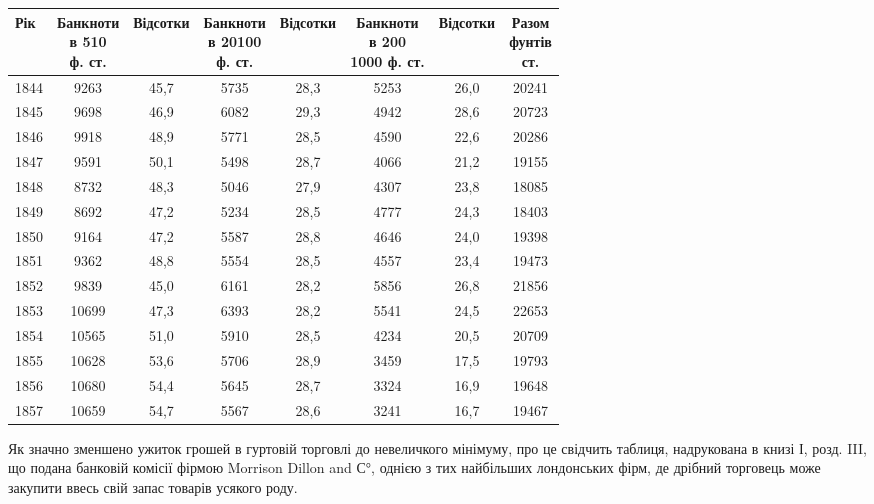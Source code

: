 \begin{table}[h]
  \small
  \begin{tabular}{l c c c c c c c}
  \toprule
Рік  &  \makecell{Банкноти\\ в 5\textendash{}10 \\ф. ст.} & Відсотки  &
\makecell{Банкноти\\ в 20\textendash{}100\\ ф. ст.} & Відсотки  &  \makecell{Банкноти\\ в 200\textendash{}\\1000
ф. ст.} & Відсотки &   \makecell{Разом\\  фунтів \\ ст.} \\
  \midrule
1844    &     \phantom{0}9263  &  45,7  &  5735 & 28,3 & 5253 &   26,0 &   20241\\
1845    &     \phantom{0}9698  &  46,9  &  6082 & 29,3 & 4942 &   28,6 &   20723\\
1846    &     \phantom{0}9918  &  48,9  &  5771 & 28,5 & 4590 &   22,6 &   20286\\
1847    &     \phantom{0}9591  &  50,1  &  5498 & 28,7 & 4066 &   21,2 &   19155\\
1848    &     \phantom{0}8732  &  48,3  &  5046 & 27,9 & 4307 &   23,8 &   18085\\
1849    &     \phantom{0}8692  &  47,2  &  5234 & 28,5 & 4777 &   24,3 &   18403\\
1850    &     \phantom{0}9164  &  47,2  &  5587 & 28,8 & 4646 &   24,0 &   19398\\
1851    &     \phantom{0}9362  &  48,8  &  5554 & 28,5 & 4557 &   23,4 &   19473\\
1852    &     \phantom{0}9839  &  45,0  &  6161 & 28,2 & 5856 &   26,8 &   21856\\
1853    &     10699 &  47,3  &  6393 & 28,2 & 5541 &   24,5 &   22653\\
1854    &     10565 &  51,0  &  5910 & 28,5 & 4234 &   20,5 &   20709\\
1855    &     10628 &  53,6  &  5706 & 28,9 & 3459 &   17,5 &   19793\\
1856    &     10680 &  54,4  &  5645 & 28,7 & 3324 &   16,9 &   19648\\
1857    &     10659 &  54,7  &  5567 & 28,6 & 3241 &   16,7 &   19467\\
\end{tabular}
\end{table}
Як значно зменшено ужиток грошей в гуртовій торговлі до невеличкого
мінімуму, про це свідчить таблиця, надрукована в книзі І, розд. III,
що подана банковій комісії фірмою Morrison Dillon and С°, однією з тих найбільших
лондонських фірм, де дрібний торговець може закупити ввесь свій запас
товарів усякого роду.

